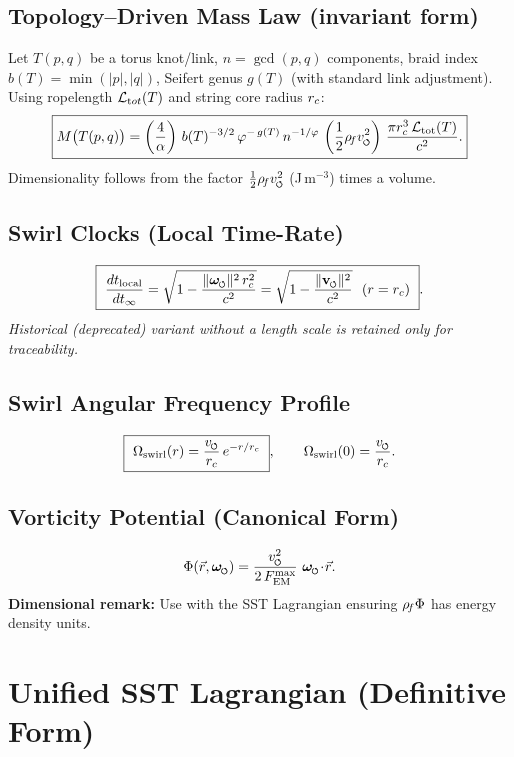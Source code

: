 \documentclass[11pt]{article}
\begin{document}
    \subsection{Topology–Driven Mass Law (invariant form)}
    Let \(T(p,q)\) be a torus knot/link, \(n=\gcd(p,q)\) components, braid index \(b(T)=\min(|p|,|q|)\), Seifert genus \(g(T)\) (with standard link adjustment). Using ropelength \(\mathcal{L}_{\textrm tot}(T)\) and string core radius \(r_c\):
    \[
        \boxed{
            M\big(T(p,q)\big)
            =\left(\frac{4}{\alpha}\right)\,
            b(T)^{-3/2}\,
            \varphi^{-\,g(T)}\,
            n^{-1/\varphi}\,
            \left(\frac{1}{2}\rhof \vscore^2\right)\,
            \frac{\pi \rc^3\,\mathcal{L}_{\mathrm{tot}}(T)}{c^2}.
        }
    \]
    Dimensionality follows from the factor \(\tfrac12\rhof \vscore^2\) (J\,m\(^{-3}\)) times a volume.

    \subsection{Swirl Clocks (Local Time-Rate)}
        \label{sec:swirl_clocks}
    \[
        \boxed{\ \frac{dt_{\text{local}}}{dt_{\infty}}
            = \sqrt{1 - \frac{\lVert\omegas\rVert^{2}\,\rc^{2}}{c^{2}}}
            = \sqrt{1 - \frac{\lVert\vswirl\rVert^{2}}{c^{2}}}\ \ (r=\rc)\ }.
    \]
    \emph{Historical (deprecated) variant without a length scale is retained only for traceability.}

    \subsection{Swirl Angular Frequency Profile}
    \[
        \boxed{\ \Omega_{\text{swirl}}(r) = \frac{\vscore}{\rc}\, e^{-r/\rc}\ },
        \qquad
        \Omega_{\text{swirl}}(0)=\frac{\vscore}{\rc}.
    \]

    \subsection{Vorticity Potential (Canonical Form)}
    \[
        \Phi(\vec r,\omegas) = \frac{\vscore^{2}}{2\,F_{\text{EM}}^{\max}}\ \omegas\!\cdot\!\vec r.
    \]
    \textbf{Dimensional remark:} Use with the SST Lagrangian ensuring \(\rho_{\!f}\Phi\) has energy density units.

    \section{Unified SST Lagrangian (Definitive Form)}
    \label{sec:lagrangian}
\end{document}
